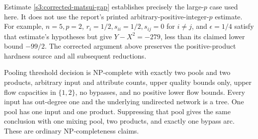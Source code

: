 \begin{remark}\label{s3:matsui-scope}
Estimate \eqref{s3:corrected-matsui-gap} establishes precisely the
large-$p$ case used here. It does not use the report's printed
arbitrary-positive-integer-$p$ estimate. For example, $n=5,p=2$,
$r_i=1/2,s_{ii}=1/2,s_{ij}=0$ for $i\ne j$, and
$\epsilon=1/4$ satisfy that estimate's hypotheses but give
$Y-X^2=-279$, less than its claimed lower bound $-99/2$.
The corrected argument above preserves the positive-product hardness
source and all subsequent reductions.
\end{remark}

\begin{theorem}\label{s3:two-pools}
Pooling threshold decision is NP-complete with exactly two pools and two
products, arbitrary input and attribute counts, upper quality bounds only,
upper flow capacities in $\{1,2\}$, no bypasses, and no positive lower
flow bounds. Every input has out-degree one and the underlying undirected
network is a tree. One pool has one input and one product. Suppressing
that pool gives the same conclusion with one mixing pool, two products,
and exactly one bypass arc. These are ordinary NP-completeness claims.
\end{theorem}
